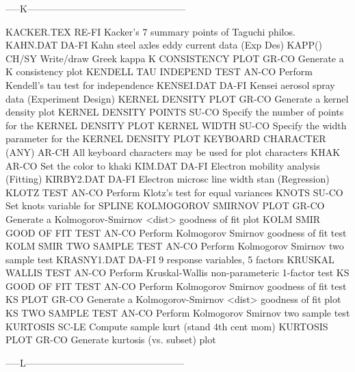 -----K--------------------------------------------------

KACKER.TEX                  RE-FI Kacker's 7 summary points of Taguchi philos.
KAHN.DAT                    DA-FI Kahn steel axles eddy current data (Exp Des)
KAPP()                      CH/SY Write/draw Greek kappa
K CONSISTENCY PLOT          GR-CO Generate a K consistency plot
KENDELL TAU INDEPEND TEST   AN-CO Perform Kendell's tau test for independence
KENSEI.DAT                  DA-FI Kensei aerosol spray data (Experiment Design)
KERNEL DENSITY PLOT         GR-CO Generate a kernel density plot
KERNEL DENSITY POINTS       SU-CO Specify the number of points for the KERNEL DENSITY PLOT
KERNEL WIDTH                SU-CO Specify the width parameter for the KERNEL DENSITY PLOT
KEYBOARD CHARACTER (ANY)    AR-CH All keyboard characters may be used for plot characters
KHAK                        AR-CO Set the color to khaki
KIM.DAT                     DA-FI Electron mobility analysis (Fitting)
KIRBY2.DAT                  DA-FI Electron microsc line width stan (Regression)
KLOTZ TEST                  AN-CO Perform Klotz's test for equal variances
KNOTS                       SU-CO Set knots variable for SPLINE
KOLMOGOROV SMIRNOV PLOT     GR-CO Generate a Kolmogorov-Smirnov <dist> goodness of fit plot
KOLM SMIR GOOD OF FIT TEST  AN-CO Perform Kolmogorov Smirnov goodness of fit test
KOLM SMIR TWO SAMPLE TEST   AN-CO Perform Kolmogorov Smirnov two sample test
KRASNY1.DAT                 DA-FI 9 response variables, 5 factors
KRUSKAL WALLIS TEST         AN-CO Perform Kruskal-Wallis non-parameteric 1-factor test
KS GOOD OF FIT TEST         AN-CO Perform Kolmogorov Smirnov goodness of fit test
KS PLOT                     GR-CO Generate a Kolmogorov-Smirnov <dist> goodness of fit plot
KS TWO SAMPLE TEST          AN-CO Perform Kolmogorov Smirnov two sample test
KURTOSIS                    SC-LE Compute sample kurt (stand 4th cent mom)
KURTOSIS PLOT               GR-CO Generate kurtosis (vs. subset) plot

-----L--------------------------------------------------


